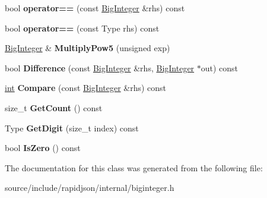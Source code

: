 \begin{DoxyCompactItemize}
\item 
\hypertarget{classinternal_1_1_big_integer_a567ecda3009de20400a2af649fb87e60}{}bool {\bfseries operator==} (const \hyperlink{classinternal_1_1_big_integer}{Big\+Integer} \&rhs) const \label{classinternal_1_1_big_integer_a567ecda3009de20400a2af649fb87e60}

\item 
\hypertarget{classinternal_1_1_big_integer_a329eddac1b724f82d56af2ee2c8abcc4}{}bool {\bfseries operator==} (const Type rhs) const \label{classinternal_1_1_big_integer_a329eddac1b724f82d56af2ee2c8abcc4}

\item 
\hypertarget{classinternal_1_1_big_integer_a98a13f169c27d1acfa57054f37c61763}{}\hyperlink{classinternal_1_1_big_integer}{Big\+Integer} \& {\bfseries Multiply\+Pow5} (unsigned exp)\label{classinternal_1_1_big_integer_a98a13f169c27d1acfa57054f37c61763}

\item 
\hypertarget{classinternal_1_1_big_integer_a5741304ce36392adeef716e78b384b61}{}bool {\bfseries Difference} (const \hyperlink{classinternal_1_1_big_integer}{Big\+Integer} \&rhs, \hyperlink{classinternal_1_1_big_integer}{Big\+Integer} $\ast$out) const \label{classinternal_1_1_big_integer_a5741304ce36392adeef716e78b384b61}

\item 
\hypertarget{classinternal_1_1_big_integer_afd8b15480df5003ee6b6e1b8ecbf5f45}{}\hyperlink{_s_d_l__thread_8h_a6a64f9be4433e4de6e2f2f548cf3c08e}{int} {\bfseries Compare} (const \hyperlink{classinternal_1_1_big_integer}{Big\+Integer} \&rhs) const \label{classinternal_1_1_big_integer_afd8b15480df5003ee6b6e1b8ecbf5f45}

\item 
\hypertarget{classinternal_1_1_big_integer_a720114cef0871c9f9c3c6a5f3a66e66a}{}size\+\_\+t {\bfseries Get\+Count} () const \label{classinternal_1_1_big_integer_a720114cef0871c9f9c3c6a5f3a66e66a}

\item 
\hypertarget{classinternal_1_1_big_integer_a92c6854f2388875374cfb9801bea0cc8}{}Type {\bfseries Get\+Digit} (size\+\_\+t index) const \label{classinternal_1_1_big_integer_a92c6854f2388875374cfb9801bea0cc8}

\item 
\hypertarget{classinternal_1_1_big_integer_a99cf9cb87491a583c6b7614b0c8654fe}{}bool {\bfseries Is\+Zero} () const \label{classinternal_1_1_big_integer_a99cf9cb87491a583c6b7614b0c8654fe}

\end{DoxyCompactItemize}


The documentation for this class was generated from the following file\+:\begin{DoxyCompactItemize}
\item 
source/include/rapidjson/internal/biginteger.\+h\end{DoxyCompactItemize}
